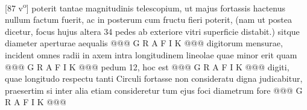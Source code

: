 [87 v\textsuperscript{o}]  poterit tantae magnitudinis telescopium\protect{}, ut majus fortassis  hactenus nullum factum fuerit, ac in posterum cum fructu  fieri poterit, (nam ut postea dicetur, focus hujus altera  34 pedes ab exteriore vitri superficie distabit.) sitque  diameter aperturae aequalis @@@ G R A F I K @@@%
                     digitorum mensurae, incident  omnes radii in axem intra longitudinem lineolae quae minor  erit quam @@@ G R A F I K @@@%
                     pedum 12, hoc est @@@ G R A F I K @@@%
                     digiti, quae longitudo  respectu tanti Circuli fortasse non consideratu digna  judicabitur, praesertim si inter alia etiam consideretur tum  ejus foci diametrum fore @@@ G R A F I K @@@%
